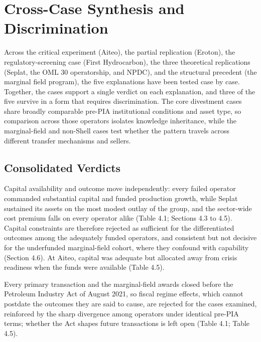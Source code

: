 \hypertarget{cross-case-synthesis-and-discrimination}{%
\section{Cross-Case Synthesis and
Discrimination}\label{cross-case-synthesis-and-discrimination}}

Across the critical experiment (Aiteo), the partial replication
(Eroton), the regulatory-screening case (First Hydrocarbon), the three
theoretical replications (Seplat, the OML 30 operatorship, and NPDC),
and the structural precedent (the marginal field program), the five
explanations have been tested case by case. Together, the cases support
a single verdict on each explanation, and three of the five survive in a
form that requires discrimination. The core divestment cases share
broadly comparable pre-PIA institutional conditions and asset type, so
comparison across those operators isolates knowledge inheritance, while
the marginal-field and non-Shell cases test whether the pattern travels
across different transfer mechanisms and sellers.

\hypertarget{consolidated-verdicts}{%
\subsection{Consolidated Verdicts}\label{consolidated-verdicts}}

Capital availability and outcome move independently: every failed
operator commanded substantial capital and funded production growth,
while Seplat sustained its assets on the most modest outlay of the
group, and the sector-wide cost premium falls on every operator alike
(Table 4.1; Sections 4.3 to 4.5). Capital constraints are therefore
rejected as sufficient for the differentiated outcomes among the
adequately funded operators, and consistent but not decisive for the
underfunded marginal-field cohort, where they confound with capability
(Section 4.6). At Aiteo, capital was adequate but allocated away from
crisis readiness when the funds were available (Table 4.5).

Every primary transaction and the marginal-field awards closed before
the Petroleum Industry Act of August 2021, so fiscal regime effects,
which cannot postdate the outcomes they are said to cause, are rejected
for the cases examined, reinforced by the sharp divergence among
operators under identical pre-PIA terms; whether the Act shapes future
transactions is left open (Table 4.1; Table 4.5).

